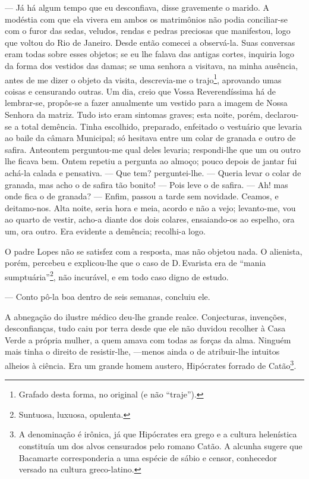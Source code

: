 --- Já há algum tempo que eu desconfiava, disse gravemente o marido. A
modéstia com que ela vivera em ambos os matrimônios não podia
conciliar-se com o furor das sedas, veludos, rendas e pedras preciosas
que manifestou, logo que voltou do Rio de Janeiro. Desde então comecei a
observá-la. Suas conversas eram todas sobre esses objetos; se eu lhe
falava das antigas cortes, inquiria logo da forma dos vestidos das
damas; se uma senhora a visitava, na minha ausência, antes de me dizer o
objeto da visita, descrevia-me o trajo\footnote{Grafado desta forma, no
  original (e não ``traje'').}, aprovando umas coisas e censurando
outras. Um dia, creio que Vossa Reverendíssima há de lembrar-se,
propôs-se a fazer anualmente um vestido para a imagem de Nossa Senhora
da matriz. Tudo isto eram sintomas graves; esta noite, porém,
declarou-se a total demência. Tinha escolhido, preparado, enfeitado o
vestuário que levaria ao baile da câmara Municipal; só hesitava entre um
colar de granada e outro de safira. Anteontem perguntou-me qual deles
levaria; respondi-lhe que um ou outro lhe ficava bem. Ontem repetiu a
pergunta ao almoço; pouco depois de jantar fui achá-la calada e
pensativa. --- Que tem? perguntei-lhe. --- Queria levar o colar de
granada, mas acho o de safira tão bonito! --- Pois leve o de safira. ---
Ah! mas onde fica o de granada? --- Enfim, passou a tarde sem novidade.
Ceamos, e deitamo-nos. Alta noite, seria hora e meia, acordo e não a
vejo; levanto-me, vou ao quarto de vestir, acho-a diante dos dois
colares, ensaiando-os ao espelho, ora um, ora outro. Era evidente a
demência; recolhi-a logo.

O padre Lopes não se satisfez com a resposta, mas não objetou nada. O
alienista, porém, percebeu e explicou-lhe que o caso de D.\,Evarista era
de ``mania sumptuária''\footnote{Suntuosa, luxuosa, opulenta.}, não
incurável, e em todo caso digno de estudo.

--- Conto pô-la boa dentro de seis semanas, concluiu ele.

A abnegação do ilustre médico deu-lhe grande realce. Conjecturas,
invenções, desconfianças, tudo caiu por terra desde que ele não duvidou
recolher à Casa Verde a própria mulher, a quem amava com todas as forças
da alma. Ninguém mais tinha o direito de resistir-lhe, ---menos ainda o
de atribuir-lhe intuitos alheios à ciência. Era um grande homem austero,
Hipócrates forrado de Catão\footnote{A denominação é irônica, já que
  Hipócrates era grego e a cultura helenística constituía um dos alvos
  censurados pelo romano Catão. A alcunha sugere que Bacamarte
  corresponderia a uma espécie de sábio e censor, conhecedor versado na
  cultura greco-latino.}.

